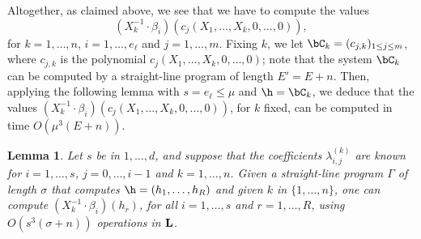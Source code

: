 \documentclass[12pt]{article}
\newtheorem{lemma}[definition]{Lemma}
\begin{document}
Altogether, as claimed above, we see that we have to compute the
values
$$(X_k^{-1} \cdot \beta_i)(c_j(X_1,\dots,X_k,0,\dots,0)),$$ for
$k=1,\dots,n$, $i=1,\dots,e_\ell$ and $j=1,\dots,m$.  Fixing $k$, we
let $\bC_k = (c_{j,k})_{1 \le j \le m}$, where $c_{j,k}$ is the
polynomial $c_j(X_1,\dots,X_k,0,\dots,0)$; note that the system
$\bC_k$ can be computed by a straight-line program of length
$E'= E+n$. Then, applying the following lemma with
$s=e_\ell \le \mu$ and $\h = \bC_k$, we deduce that the values
$(X_k^{-1} \cdot \beta_i)(c_j(X_1,\dots,X_k,0,\dots,0))$, for $k$
fixed, can be computed in time $O(\mu^3 (E+n))$.


\begin{lemma}
  Let $s$ be in $1,\dots,d$, and suppose that the coefficients
  $\lambda^{(k)}_{i,j}$ are known for $i=1,\dots,s$, $j=0,\dots,i-1$
  and $k=1,\dots,n$. Given a straight-line program $\Gamma$ of length
  $\sigma$ that computes $\h=(h_1,\dots,h_R)$ and given $k$ in
  $\{1,\dots,n\}$, one can compute $(X_k^{-1}\cdot \beta_i)(h_r)$, for
  all $i=1,\dots,s$ and $r=1,\dots,R$, using $O(s^3 (\sigma+n))$
  operations in $\mathbf{L}$.
\end{lemma}
\end{document}
